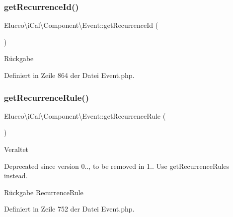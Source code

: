 \subsubsection{\texorpdfstring{get\+Recurrence\+Id()}{getRecurrenceId()}\hspace{0.1cm}{\footnotesize\ttfamily [3/3]}}
{\footnotesize\ttfamily Eluceo\textbackslash{}i\+Cal\textbackslash{}\+Component\textbackslash{}\+Event\+::get\+Recurrence\+Id (\begin{DoxyParamCaption}{ }\end{DoxyParamCaption})}

\begin{DoxyReturn}{Rückgabe}

\end{DoxyReturn}


Definiert in Zeile 864 der Datei Event.\+php.

\mbox{\label{class_eluceo_1_1i_cal_1_1_component_1_1_event_a4414331a51599c2dd5432eba86008518}} 
\subsubsection{\texorpdfstring{get\+Recurrence\+Rule()}{getRecurrenceRule()}\hspace{0.1cm}{\footnotesize\ttfamily [1/3]}}
{\footnotesize\ttfamily Eluceo\textbackslash{}i\+Cal\textbackslash{}\+Component\textbackslash{}\+Event\+::get\+Recurrence\+Rule (\begin{DoxyParamCaption}{ }\end{DoxyParamCaption})}

\begin{DoxyRefDesc}{Veraltet}
\item[\mbox{\hyperlink{deprecated__deprecated000006}{Veraltet}}]Deprecated since version 0.., to be removed in 1.. Use get\+Recurrence\+Rules instead.\end{DoxyRefDesc}


\begin{DoxyReturn}{Rückgabe}
Recurrence\+Rule 
\end{DoxyReturn}


Definiert in Zeile 752 der Datei Event.\+php.

